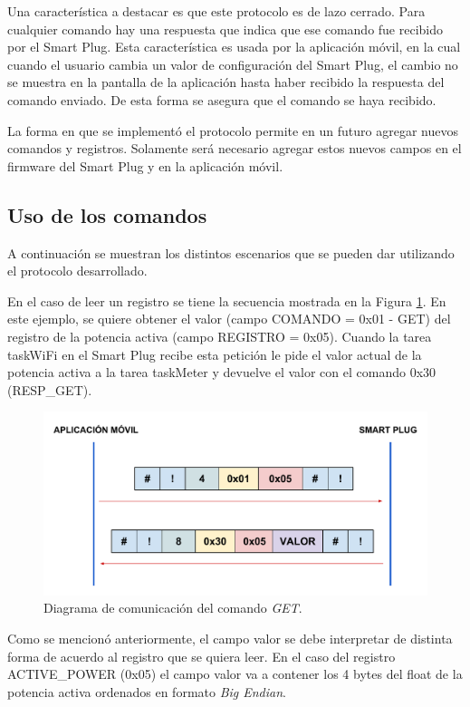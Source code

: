 Una característica a destacar es que este protocolo es de lazo cerrado. Para cualquier comando hay una respuesta que indica que ese comando fue recibido por el Smart Plug. Esta característica es usada por la aplicación móvil, en la cual cuando el usuario cambia un valor de configuración del Smart Plug, el cambio no se muestra en la pantalla de la aplicación hasta haber recibido la respuesta del comando enviado. De esta forma se asegura que el comando se haya recibido.

La forma en que se implementó el protocolo permite en un futuro agregar nuevos comandos y registros. Solamente será necesario agregar estos nuevos campos en el firmware del Smart Plug y en la aplicación móvil.


\subsection{Uso de los comandos}

A continuación se muestran los distintos escenarios que se pueden dar utilizando el protocolo desarrollado.

En el caso de leer un registro se tiene la secuencia mostrada en la Figura \ref{fig:comunicacion_get}. En este ejemplo, se quiere obtener el valor (campo COMANDO = 0x01 - GET) del registro de la potencia activa (campo REGISTRO = 0x05). Cuando la tarea taskWiFi en el Smart Plug recibe esta petición le pide el valor actual de la potencia activa a la tarea taskMeter y devuelve el valor con el comando 0x30 (RESP\_GET).

\begin{figure}[h]
	\centering
	\includegraphics[width=14cm]{./Figures/3_2_5_comunicacion_GET.pdf}
	\caption{Diagrama de comunicación del comando \textit{GET}.}
	\label{fig:comunicacion_get}
\end{figure}

Como se mencionó anteriormente, el campo valor se debe interpretar de distinta forma de acuerdo al registro que se quiera leer. En el caso del registro ACTIVE\_POWER (0x05) el campo valor va a contener los 4 bytes del float de la potencia activa ordenados en formato \textit{Big Endian}.

